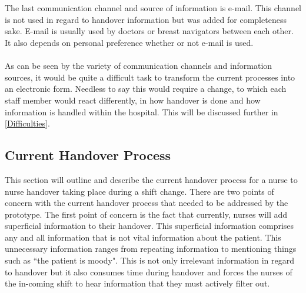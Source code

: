 \\ \\
The last communication channel and source of information is e-mail. This channel is not used in regard to handover information but was added for completeness sake. E-mail is usually used by doctors or breast navigators between each other. It also depends on personal preference whether or not e-mail is used. 
\\ \\
As can be seen by the variety of communication channels and information sources, it would be quite a difficult task to transform the current processes into an electronic form. Needless to say this would require a change, to which each staff member would react differently, in how handover is done and how information is handled within the hospital. This will be discussed further in \ref{Difficulties}.

\subsection{Current Handover Process}
\label{Current Handover Process}
This section will outline and describe the current handover process for a nurse to nurse handover taking place during a shift change. There are two points of concern with the current handover process that needed to be addressed by the prototype. The first point of concern is the fact that currently, nurses will add superficial information to their handover. This superficial information comprises any and all information that is not vital information about the patient. This unnecessary information ranges from repeating information to mentioning things such as ``the patient is moody". This is not only irrelevant information in regard to handover but it also consumes time during handover and forces the nurses of the in-coming shift to hear information that they must actively filter out.

